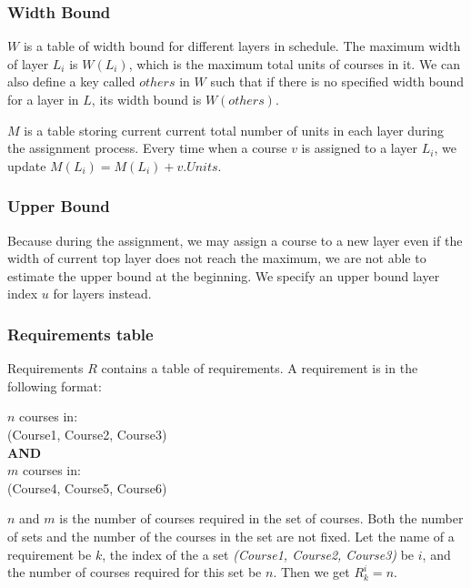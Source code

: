 \documentclass[letterpaper,12pt]{article}
\theoremstyle{definition}
\begin{document}
\subsubsection{Width Bound}
$W$ is a table of width bound for different layers in schedule. The maximum width of layer $L_i$ is $W(L_i)$, which is the maximum total units of courses in it. We can also define a key called $others$ in $W$ such that if there is no specified width bound for a layer in $L$, its width bound is $W(others)$.

$M$ is a table storing current current total number of units in each layer during the assignment process. Every time when a course $v$ is assigned to a layer $L_i$, we update $M(L_i)=M(L_i)+v.Units$.
\subsubsection{Upper Bound}
Because during the assignment, we may assign a course to a new layer even if the width of current top layer does not reach the maximum,
we are not able to estimate the upper bound at the beginning. We specify an upper bound layer index $u$ for layers instead. 
\subsubsection{Requirements table}
Requirements $R$ contains a table of requirements. A requirement is in the following format:
    \begin{displayquote}
    $n$ courses in:\\
    (Course1, Course2, Course3)\\
    \textbf{AND}\\
    $m$ courses in:\\
    (Course4, Course5, Course6)
    \end{displayquote}
$n$ and $m$ is the number of courses required in the set of courses. Both the number of sets and the number of the courses in the set are not fixed.
Let the name of a requirement be $k$, the index of the a set \textit{(Course1, Course2, Course3)} be $i$, and the number of courses required for this set be $n$. Then we get $R_k^i=n$. 
\end{document}
